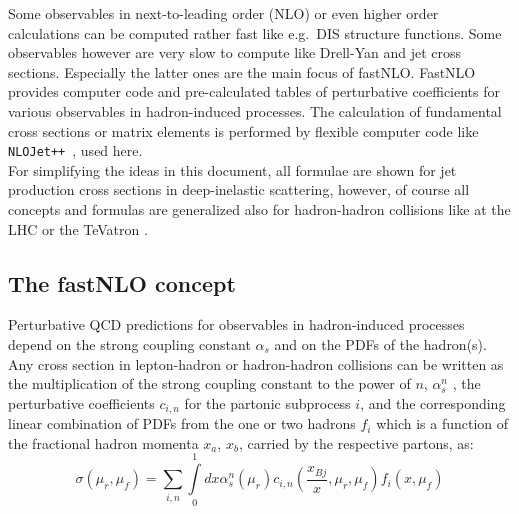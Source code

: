 \documentclass{DISproc}
\begin{document}
Some observables in next-to-leading order (NLO) or even higher order
calculations can be computed rather fast like e.g.\ DIS structure
functions.  Some observables however are very slow to compute like
Drell-Yan and jet cross sections. Especially the latter ones are the
main focus of fastNLO.  FastNLO provides computer code and
pre-calculated tables of perturbative coefficients for various
observables in hadron-induced processes.
The calculation of fundamental cross sections or matrix elements is
performed by flexible computer code like
\texttt{NLOJet++}~\cite{Nagy:99,Nagy:01},
used here.\\

For simplifying the ideas in this document, all formulae are shown for
jet production cross sections in deep-inelastic scattering, however,
of course all concepts and formulas are generalized also for
hadron-hadron collisions like at the LHC or the TeVatron \cite{Kluge:2006xs}.\\


\subsection{The fastNLO concept}

Perturbative QCD predictions for observables in hadron-induced
processes depend on the strong coupling constant $\alpha_s$ and on the
PDFs of the hadron(s). Any cross section in lepton-hadron or
hadron-hadron collisions can be written as the multiplication of the
strong coupling constant to the power of $n$, $\alpha_s^n$ , the
perturbative coefficients $c_{i,n}$ for the partonic subprocess $i$,
and the corresponding linear combination of PDFs from the one or two
hadrons $f_i$ which is a function of the fractional hadron momenta
$x_a$, $x_b$, carried by the respective partons, as:
\begin{equation}\label{eq:CrossSection}
  \sigma(\mu_r,\mu_f) =
  \sum\limits_{i,n}\int\limits_0^1dx\alpha_s^n(\mu_r)c_{i,n}(\frac{x_{Bj}}{x},\mu_r,\mu_f)f_i(x,\mu_f)
\end{equation}
\end{document}
